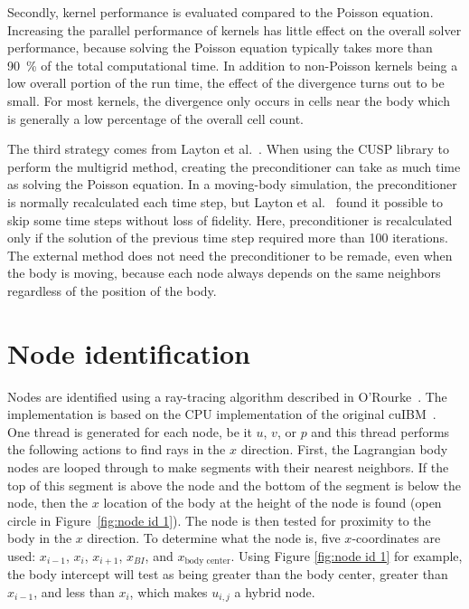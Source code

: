 Secondly, kernel performance is evaluated compared to the Poisson equation. 
Increasing the parallel performance of kernels has little effect on the overall solver performance, because solving the Poisson equation typically takes more than \SI{90}{\percent} of the total computational time. 
In addition to non-Poisson kernels being a low overall portion of the run time, the effect of the divergence turns out to be small. 
For most kernels, the divergence only occurs in cells near the body which is generally a low percentage of the overall cell count. 

The third strategy comes from Layton et al.~\cite{layton2011cuibm}.
When using the CUSP library to perform the multigrid method, creating the preconditioner can take as much time as solving the Poisson equation.
In a moving-body simulation, the preconditioner is normally recalculated each time step, but Layton et al.~\cite{layton2011cuibm} found it possible to skip some time steps without loss of fidelity.
Here, preconditioner is recalculated only if the solution of the previous time step required more than 100 iterations. 
The external method does not need the preconditioner to be remade, even when the body is moving, because each node always depends on the same neighbors regardless of the position of the body. 

\section{Node identification}
Nodes are identified using a ray-tracing algorithm described in O'Rourke~\cite{o1998computational}.
The implementation is based on the CPU implementation of the original cuIBM~\cite{krishnan2012validation}. 
One thread is generated for each node, be it $u$, $v$, or $p$ and this thread performs the following actions to find rays in the $x$ direction. 
First, the Lagrangian body nodes are looped through to make segments with their nearest neighbors. 
If the top of this segment is above the node and the bottom of the segment is below the node, then the $x$ location of the body at the height of the node is found (open circle in Figure~\ref{fig:node id 1}).
The node is then tested for proximity to the body in the $x$ direction. 
To determine what the node is, five $x$-coordinates are used: $x_{i-1}$, $x_{i}$, $x_{i+1}$, $x_{BI}$, and $x_{\text{body center}}$. 
Using Figure \ref{fig:node id 1} for example, the body intercept will test as being greater than the body center, greater than $x_{i-1}$, and less than $x_{i}$, which makes $u_{i,j}$ a hybrid node. 

